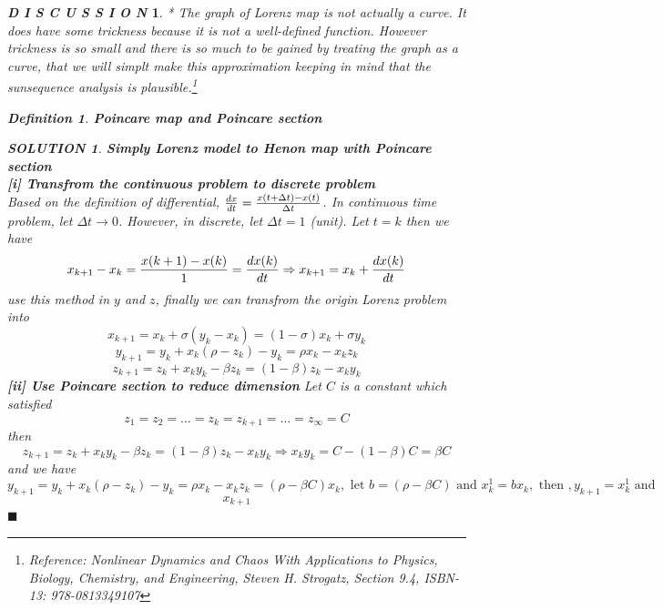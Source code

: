 \documentclass[12pt]{article}
\theoremstyle{plain}
\newtheorem{definition}{\textbf{Definition}}[section]
\newtheorem{solution}{\textit{SOLUTION}}[section]
\newtheorem{discussion}{\textit{D I S C U S S I O N}}[section]
\begin{document}
\begin{discussion}
* The graph of Lorenz map is not actually a curve. It does have some trickness because it is not a well-defined function. However trickness is so small and there is so much to be gained by treating the graph as a curve, that we will simplt make this approximation keeping in mind that the sunsequence analysis is plausible.\footnote{Reference: Nonlinear Dynamics and Chaos With Applications to Physics, Biology, Chemistry, and Engineering, Steven H. Strogatz, Section 9.4, ISBN-13: 978-0813349107}





\begin{definition}\textbf{Poincare map and Poincare section}
\\\noindent 

\end{definition}







\begin{solution}\textbf{Simply Lorenz model to Henon map with Poincare section}
\\\noindent \textbf{[i] Transfrom the continuous problem to discrete problem}
\\\noindent Based on the definition of differential, ${dx \over dt} = {x(t+\Delta t) - x(t)\over \Delta t}$. In continuous time problem, let $\Delta t \rightarrow 0$. However, in discrete, let $\Delta t = 1$ (unit). Let $t = k$ then we have
$$
x_{k+1} - x_{k} = {x(k+1) - x(k) \over 1} = {dx(k) \over dt} \Rightarrow x_{k+1} = x_{k} + {dx(k) \over dt} 
$$
use this method in $y$ and $z$, finally we can transfrom the origin Lorenz problem into 
$$
x_{k+1} = x_k + \sigma(y_k - x_k) = (1 - \sigma) x_k + \sigma y_k
$$
$$
y_{k+1} = y_k + x_k(\rho - z_k) - y_k = \rho x_k - x_k z_k
$$
$$
z_{k+1} = z_k + x_ky_k - \beta z_k= (1- \beta) z_k - x_k y_k
$$
            \textbf{[ii] Use Poincare section to reduce dimension}
Let $C$ is a constant which satisfied 
$$
z_1 = z_2 = \ldots = z_k = z_{k+1} = \ldots = z_{\infty} = C
$$
then 
$$
z_{k+1} = z_k + x_ky_k - \beta z_k= (1- \beta) z_k - x_k y_k \Rightarrow x_ky_k = C - (1 - \beta) C = \beta C
$$
and we have 
$$
y_{k+1} = y_k + x_k(\rho - z_k) - y_k = \rho x_k - x_k z_k = (\rho - \beta C) x_k, \text{ let } b = (\rho - \beta C) \text{ and }x^1_k = b x_k, \text{ then }, y_{k+1} = x_k^1 \text{ and}
$$
$$
x_{k+1}
$$
$\blacksquare$


\end{solution}
\end{discussion}
\end{document}
